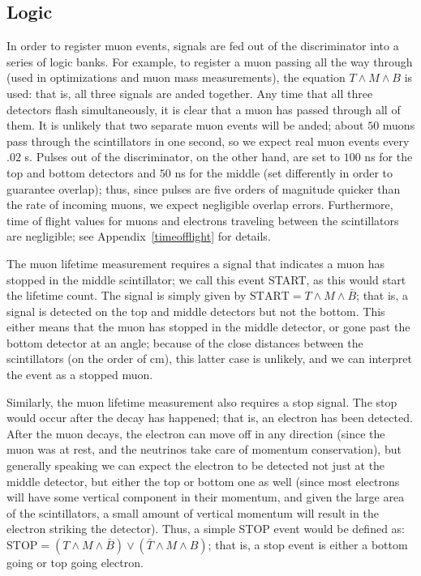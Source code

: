 \subsection{Logic}
\label{logic}

In order to register muon events, signals are fed out of the discriminator into a series of logic banks. For example, to register a muon passing all the way through (used in optimizations and muon mass measurements), the equation $T \wedge M \wedge B$ is used: that is, all three signals are anded together. Any time that all three detectors flash simultaneously, it is clear that a muon has passed through all of them. It is unlikely that two separate muon events will be anded; about $50$ muons pass through the scintillators in one second, so we expect real muon events every $.02$ s. Pulses out of the discriminator, on the other hand, are set to $100$ ns for the top and bottom detectors and $50$ ns for the middle (set differently in order to guarantee overlap); thus, since pulses are five orders of magnitude quicker than the rate of incoming muons, we expect negligible overlap errors. Furthermore, time of flight values for muons and electrons traveling between the scintillators are negligible; see Appendix~\ref{timeofflight} for details.

The muon lifetime measurement requires a signal that indicates a muon has stopped in the middle scintillator; we call this event START, as this would start the lifetime count. The signal is simply given by $\mathrm{START} = T \wedge M \wedge \bar{B}$; that is, a signal is detected on the top and middle detectors but not the bottom. This either means that the muon has stopped in the middle detector, or gone past the bottom detector at an angle; because of the close distances between the scintillators (on the order of cm), this latter case is unlikely, and we can interpret the event as a stopped muon.

Similarly, the muon lifetime measurement also requires a stop signal. The stop would occur after the decay has happened; that is, an electron has been detected. After the muon decays, the electron can move off in any direction (since the muon was at rest, and the neutrinos take care of momentum conservation), but generally speaking we can expect the electron to be detected not just at the middle detector, but either the top or bottom one as well (since most electrons will have some vertical component in their momentum, and given the large area of the scintillators, a small amount of vertical momentum will result in the electron striking the detector). Thus, a simple STOP event would be defined as: $\mathrm{STOP} = (T \wedge M \wedge \bar{B}) \vee (\bar{T} \wedge M \wedge B)$; that is, a stop event is either a bottom going or top going electron.

